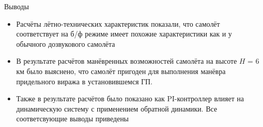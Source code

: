 \begin{frame}{Выводы}
    \begin{itemize}
    \item Расчёты лётно-технических характеристик показали, что самолёт соответствует на б/ф режиме имеет похожие характеристики 
    как и у обычного дозвукового самолёта 
    \item В результате расчётов манёвренных возможностей самолёта на высоте $H$ = 6 км было выяснено, что самолёт пригоден для выполнения 
    манёвра придельного виража в установившемся ГП.
    \item  Также в результате расчётов было показано как PI-контроллер влияет на динамическую систему с применением обратной динамики. Все соответсвующие выводы приведены 
    \end{itemize}
\end{frame}